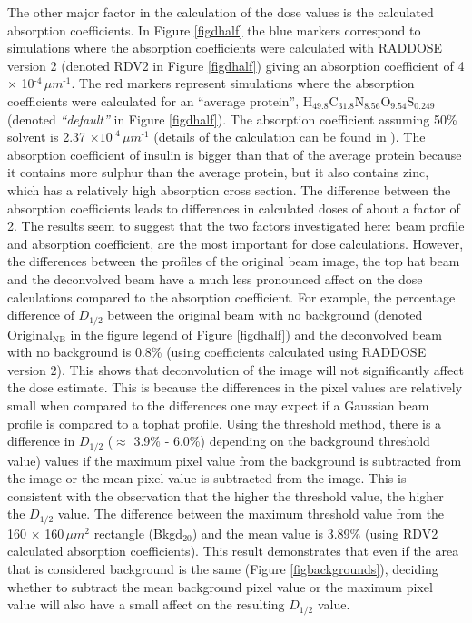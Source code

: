 The other major factor in the calculation of the dose values is the calculated absorption coefficients.
In Figure \ref{figdhalf} the blue markers correspond to simulations where the absorption coefficients were calculated with RADDOSE version 2 \cite{pait2009} (denoted RDV2 in Figure \ref{figdhalf}) giving an absorption coefficient of 4 $\times$ 10$^{\text{-4}}\, \mu m^{\text{-1}}$.
The red markers represent simulations where the absorption coefficients were calculated for an ``average protein'', H$_{\text{49.8}}$C$_{\text{31.8}}$N$_{\text{8.56}}$O$_{\text{9.54}}$S$_{\text{0.249}}$ (denoted \textit{``default''} in Figure \ref{figdhalf}).
The absorption coefficient assuming 50\% solvent is 2.37 $\times 10^{\text{-4}}\, \mu m^{\text{-1}}$ (details of the calculation can be found in \cite{holton2010}).
The absorption coefficient of insulin is bigger than that of the average protein because it contains more sulphur than the average protein, but it also contains zinc, which has a relatively high absorption cross section.
The difference between the absorption coefficients leads to differences in calculated doses of about a factor of 2.
\newline
The results seem to suggest that the two factors investigated here: beam profile and absorption coefficient, are the most important for dose calculations.
However, the differences between the profiles of the original beam image, the top hat beam and the deconvolved beam have a much less pronounced affect on the dose calculations compared to the absorption coefficient.
For example, the percentage difference of $D_{1/2}$ between the original beam with no background (denoted Original$_{\text{NB}}$ in the figure legend of Figure \ref{figdhalf}) and the deconvolved beam with no background is 0.8\% (using coefficients calculated using RADDOSE version 2).
This shows that deconvolution of the image will not significantly affect the dose estimate.
This is because the differences in the pixel values are relatively small when compared to the differences one may expect if a Gaussian beam profile is compared to a tophat profile.
\newline
Using the threshold method, there is a difference in $D_{1/2}$ ($\approx$ 3.9\% - 6.0\%) depending on the background threshold value) values if the maximum pixel value from the background is subtracted from the image or the mean pixel value is subtracted from the image.
This is consistent with the observation that the higher the threshold value, the higher the $D_{1/2}$ value.
The difference between the maximum threshold value from the 160 $\times$ 160$\, \mu m^2$ rectangle (Bkgd$_{\text{20}}$) and the mean value is 3.89\% (using RDV2 calculated absorption coefficients).
This result demonstrates that even if the area that is considered background is the same (Figure \ref{figbackgrounds}), deciding whether to subtract the mean background pixel value or the maximum pixel value will also have a small affect on the resulting $D_{1/2}$ value.

